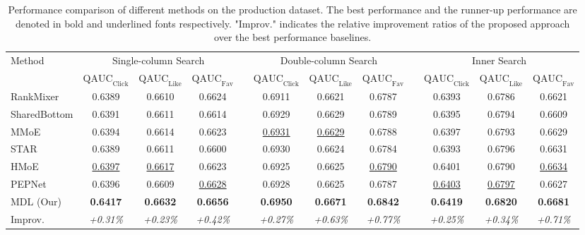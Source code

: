 \begin{table}[h]
    \centering
    \caption{Performance comparison of different methods on the production dataset. The best performance and the runner-up performance are denoted in bold and underlined fonts respectively. "Improv." indicates the relative improvement ratios of the proposed approach over the best performance baselines.}
	\label{tab:results-all}
	\begin{tabular}{l c c c c c c c c c c c}
		\toprule
		\multirow{2}{*}{Method}&\multicolumn{3}{c}{Single-column Search}&&\multicolumn{3}{c}{Double-column Search}&&\multicolumn{3}{c}{Inner Search}\\
		\cmidrule{2-4}
		\cmidrule{6-8}
		\cmidrule{10-12}
		& $\text{QAUC}_{\text{Click}}$ & $\text{QAUC}_{\text{Like}}$ & $\text{QAUC}_{\text{Fav}}$ && $\text{QAUC}_{\text{Click}}$ & $\text{QAUC}_{\text{Like}}$ & $\text{QAUC}_{\text{Fav}}$ && $\text{QAUC}_{\text{Click}}$ & $\text{QAUC}_{\text{Like}}$ & $\text{QAUC}_{\text{Fav}}$\\
        \midrule
        RankMixer & 0.6389 & 0.6610 & 0.6624 && 0.6911 & 0.6621 & 0.6787 && 0.6393 & 0.6786 & 0.6621 \\
        \midrule
        SharedBottom & 0.6391 & 0.6611 & 0.6614 && 0.6929 & 0.6629 & 0.6789 && 0.6395 & 0.6794 & 0.6609\\
        MMoE & 0.6394 & 0.6614 & 0.6623 && \underline{0.6931} & \underline{0.6629} & 0.6788 && 0.6397 & 0.6793 & 0.6629 \\
        STAR & 0.6389 & 0.6611 & 0.6600 && 0.6930 & 0.6624 & 0.6784 && 0.6393 & 0.6796 & 0.6631 \\
        HMoE & \underline{0.6397} & \underline{0.6617} & 0.6623 && 0.6925 & 0.6625 & \underline{0.6790}  && 0.6401 & 0.6790 & \underline{0.6634} \\
        PEPNet & 0.6396 & 0.6609 & \underline{0.6628} && 0.6928 & 0.6625 & 0.6787  && \underline{0.6403} & \underline{0.6797} & 0.6627 \\
		\midrule
		MDL (Our) & \textbf{0.6417} & \textbf{0.6632} & \textbf{0.6656} && \textbf{0.6950} & \textbf{0.6671} & \textbf{0.6842} && \textbf{0.6419} & \textbf{0.6820} & \textbf{0.6681} \\
        Improv. & \emph{+0.31\%} & \emph{+0.23\%} & \emph{+0.42\%} && \emph{+0.27\%} & \emph{+0.63\%} & \emph{+0.77\%} && \emph{+0.25\%} & \emph{+0.34\%} & \emph{+0.71\%} \\
		\bottomrule
	\end{tabular}
\end{table}


